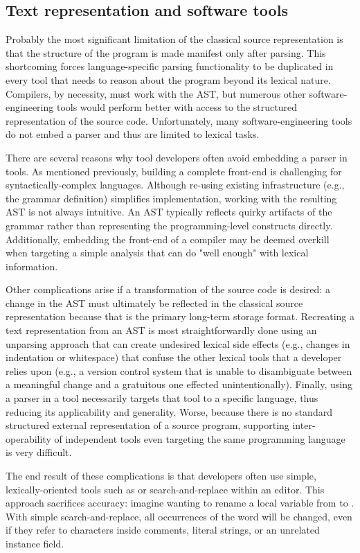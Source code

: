 \documentclass{article}
\begin{document}
\begin{multicols}{2}
\subsection{Text representation and software tools}

Probably the most significant limitation of the classical source
representation is that the structure of the program is made manifest
only after parsing.  This shortcoming forces language-specific parsing
functionality to be duplicated in every tool that needs to reason about
the program beyond its lexical nature.  Compilers, by necessity, must
work with the AST, but numerous other software-engineering tools would
perform better with access to the structured representation of the
source code.  Unfortunately, many software-engineering tools do not
embed a parser and thus are limited to lexical tasks.

There are several reasons why tool developers often avoid embedding a
parser in tools.  As mentioned previously, building a complete front-end
is challenging for syntactically-complex languages.  Although re-using
existing infrastructure (e.g., the grammar definition) simplifies
implementation, working with the resulting AST is not always intuitive.
An AST typically reflects quirky artifacts of the grammar rather than
representing the programming-level constructs directly.  Additionally,
embedding the front-end of a compiler may be deemed overkill when
targeting a simple analysis that can do "well enough" with lexical
information.

Other complications arise if a transformation of the source code is
desired: a change in the AST must ultimately be reflected in the
classical source representation because that is the primary long-term
storage format.  Recreating a text representation from an AST is most
straightforwardly done using an unparsing approach that can create
undesired lexical side effects (e.g., changes in indentation or
whitespace) that confuse the other lexical tools that a developer relies
upon (e.g., a version control system that is unable to disambiguate
between a meaningful change and a gratuitous one effected
unintentionally).  Finally, using a parser in a tool necessarily targets
that tool to a specific language, thus reducing its applicability and
generality.  Worse, because there is no standard structured external
representation of a source program, supporting inter-operability of
independent tools even targeting the same programming language is very
difficult.

The end result of these complications is that developers often use
simple, lexically-oriented tools such as  or
search-and-replace within an editor.  This approach sacrifices accuracy:
imagine wanting to rename a local variable from  to
.  With simple search-and-replace, all occurrences of
the word will be changed, even if they refer to characters inside
comments, literal strings, or an unrelated instance field.


\end{multicols}
\end{document}
